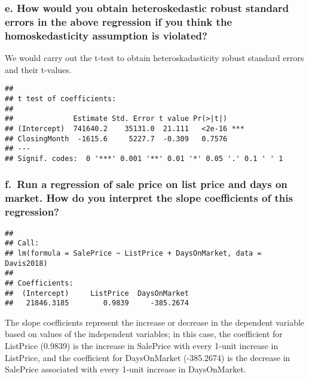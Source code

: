 \documentclass[
]{article}
\begin{document}
\hypertarget{e.-how-would-you-obtain-heteroskedastic-robust-standard-errors-in-the-above-regression-if-you-think-the-homoskedasticity-assumption-is-violated}{%
\subsubsection{e. How would you obtain heteroskedastic robust standard
errors in the above regression if you think the homoskedasticity
assumption is
violated?}\label{e.-how-would-you-obtain-heteroskedastic-robust-standard-errors-in-the-above-regression-if-you-think-the-homoskedasticity-assumption-is-violated}}

We would carry out the t-test to obtain heteroskadasticity robust
standard errors and their t-values.

\begin{verbatim}
## 
## t test of coefficients:
## 
##              Estimate Std. Error t value Pr(>|t|)    
## (Intercept)  741640.2    35131.0  21.111   <2e-16 ***
## ClosingMonth  -1615.6     5227.7  -0.309   0.7576    
## ---
## Signif. codes:  0 '***' 0.001 '**' 0.01 '*' 0.05 '.' 0.1 ' ' 1
\end{verbatim}

\hypertarget{f.-run-a-regression-of-sale-price-on-list-price-and-days-on-market.-how-do-you-interpret-the-slope-coefficients-of-this-regression}{%
\subsubsection{f.~Run a regression of sale price on list price and days
on market. How do you interpret the slope coefficients of this
regression?}\label{f.-run-a-regression-of-sale-price-on-list-price-and-days-on-market.-how-do-you-interpret-the-slope-coefficients-of-this-regression}}

\begin{verbatim}
## 
## Call:
## lm(formula = SalePrice ~ ListPrice + DaysOnMarket, data = Davis2018)
## 
## Coefficients:
##  (Intercept)     ListPrice  DaysOnMarket  
##   21846.3185        0.9839     -385.2674
\end{verbatim}

The slope coefficients represent the increase or decrease in the
dependent variable based on values of the independent variables; in this
case, the coefficient for ListPrice (0.9839) is the increase in
SalePrice with every 1-unit increase in ListPrice, and the coefficient
for DaysOnMarket (-385.2674) is the decrease in SalePrice associated
with every 1-unit increase in DaysOnMarket.
\end{document}
